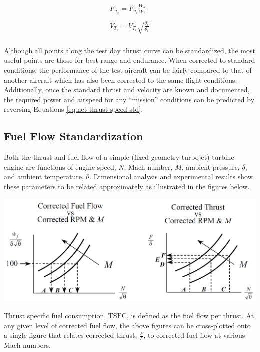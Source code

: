 \documentclass[
]{book}
\begin{document}
\begin{align}
F_{n_s} = F_{n_t} \frac{W_s}{W_t}\\
\\
V_{T_s} = V_{T_t} \sqrt{\frac{\theta_s}{\theta_t}}\\
\label{eq:net-thrust-speed-std}
\end{align}

Although all points along the test day thrust curve can be standardized, the
most useful points are those for best range and endurance. When corrected to
standard conditions, the performance of the test aircraft can be fairly compared
to that of another aircraft which has also been corrected to the same flight
conditions. Additionally, once the standard thrust and velocity are known and
documented, the required power and airspeed for any ``mission'' conditions can be
predicted by reversing Equations \eqref{eq:net-thrust-speed-std}.

\hypertarget{fuel-flow-standardization-1}{%
\subsection{Fuel Flow Standardization}\label{fuel-flow-standardization-1}}

Both the thrust and fuel flow of a simple (fixed-geometry turbojet) turbine
engine are functions of engine speed, \(N\), Mach number, \(M\), ambient
pressure, \(\delta\), and ambient temperature, \(\theta\). Dimensional analysis
and experimental results show these parameters to be related approximately as
illustrated in the figures below.

\includegraphics[width=8in,height=\textheight]{media/12/corr-fuel-flow-thrust-rpm-m.png}

Thrust specific fuel consumption, \(\mathrm{TSFC}\), is defined as the fuel flow
per thrust. At any given level of corrected fuel flow, the above figures can be
cross-plotted onto a single figure that relates corrected thrust,
\(\frac{F}{\delta}\), to corrected fuel flow at various Mach numbers.
\end{document}
